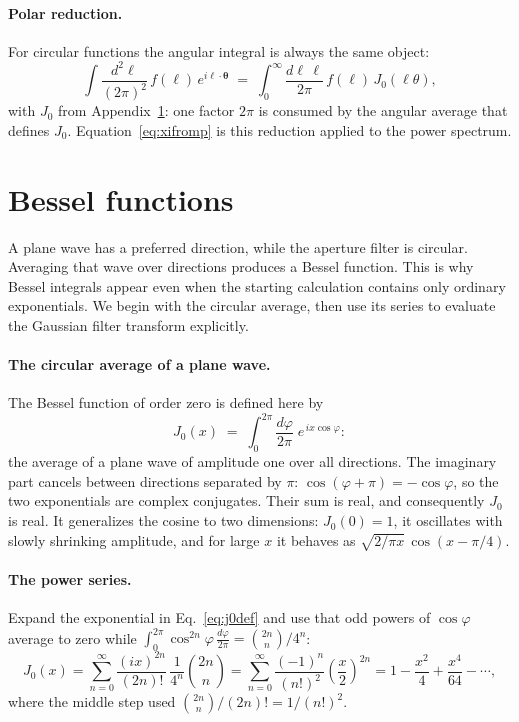 \documentclass[11pt]{article}
\newcommand{\btheta}{\boldsymbol{\theta}}
\newcommand{\bell}{\boldsymbol{\ell}}
\numberwithin{equation}{section}
\begin{document}
\paragraph{Polar reduction.}
For circular functions the angular integral is always the same
object:
\begin{equation}
  \int \frac{d^2\ell}{(2\pi)^2}\, f(\ell)\,
  e^{i\bell\cdot\btheta}
  \;=\;
  \int_0^\infty \frac{d\ell\,\ell}{2\pi}\, f(\ell)\,
  J_0(\ell\theta) ,
  \label{eq:polarreduction}
\end{equation}
with $J_0$ from Appendix~\ref{app:bessel}: one factor $2\pi$ is
consumed by the angular average that defines $J_0$.
Equation~\eqref{eq:xifromp} is this reduction applied to the power
spectrum.

\section{Bessel functions}
\label{app:bessel}

A plane wave has a preferred direction, while the aperture filter is
circular. Averaging that wave over directions produces a Bessel function.
This is why Bessel integrals appear even when the starting calculation
contains only ordinary exponentials. We begin with the circular average,
then use its series to evaluate the Gaussian filter transform explicitly.

\paragraph{The circular average of a plane wave.}
The Bessel function of order zero is defined here by
\begin{equation}
  J_0(x)
  \;=\; \int_0^{2\pi} \frac{d\varphi}{2\pi}\;
  e^{\,i x \cos\varphi} :
  \label{eq:j0def}
\end{equation}
the average of a plane wave of amplitude one over all directions.
The imaginary part cancels between directions separated by $\pi$:
$\cos(\varphi+\pi)=-\cos\varphi$, so the two exponentials are complex
conjugates. Their sum is real, and consequently $J_0$ is real.  It generalizes the
cosine to two dimensions: $J_0(0) = 1$, it oscillates with slowly
shrinking amplitude, and for large $x$ it behaves as
$\sqrt{2/\pi x}\,\cos(x - \pi/4)$.

\paragraph{The power series.}
Expand the exponential in Eq.~\eqref{eq:j0def} and use that odd
powers of $\cos\varphi$ average to zero while
$\int_0^{2\pi}\cos^{2n}\varphi\, \frac{d\varphi}{2\pi} =
\binom{2n}{n}/4^n$:
\begin{equation}
  J_0(x)
  = \sum_{n=0}^{\infty} \frac{(i x)^{2n}}{(2n)!}\,
  \frac{1}{4^n}\binom{2n}{n}
  = \sum_{n=0}^{\infty}
  \frac{(-1)^n}{(n!)^2}
  \left(\frac{x}{2}\right)^{2n}
  = 1 - \frac{x^2}{4} + \frac{x^4}{64} - \cdots ,
  \label{eq:j0series}
\end{equation}
where the middle step used
$\binom{2n}{n}/(2n)! = 1/(n!)^2$.
\end{document}

